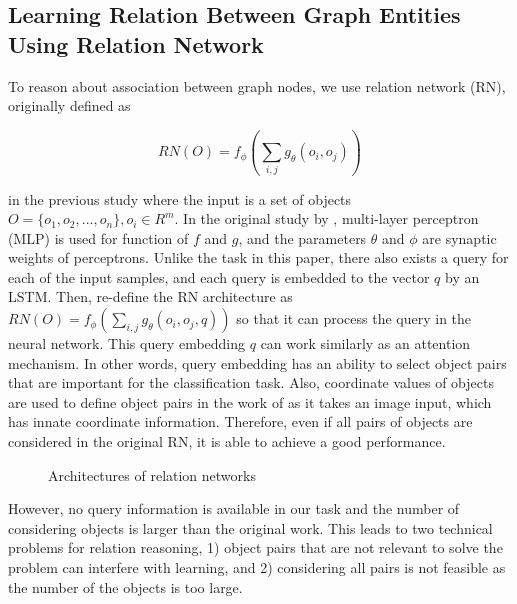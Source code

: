 \documentclass{article}
\begin{document}
\subsection{Learning Relation Between Graph Entities Using Relation Network}
To reason about association between graph nodes, we use relation network (RN), originally defined as

\begin{equation}
\label{eq_vanilla_RN}
RN(O) = f_{\phi}(\sum_{i,j}g_{\theta}(o_i,o_j))
\end{equation}

\noindent in the previous study \cite{santoro2017simple} where the input is a set of objects $O = \{o_1, o_2,..., o_n\}, o_i \in R^m$.
In the original study by \citeauthor{santoro2017simple}, multi-layer perceptron (MLP) is used for function of $f$ and $g$, and the parameters $\theta$ and $\phi$ are synaptic weights of perceptrons.
Unlike the task in this paper, there also exists a query for each of the input samples, and each query is embedded to the vector $q$ by an LSTM. Then, \citeauthor{santoro2017simple} re-define the RN architecture as $RN(O) = f_{\phi}(\sum_{i,j}g_{\theta}(o_i,o_j,q))$ so that it can process the query in the neural network.
This query embedding $q$ can work similarly as an attention mechanism. In other words, query embedding has an ability to select object pairs that are important for the classification task. Also, coordinate values of objects are used to define object pairs in the work of \citeauthor{santoro2017simple} as it takes an image input, which has innate coordinate information. Therefore, even if all pairs of objects are considered in the original RN, it is able to achieve a good performance.

\begin{figure}
\centering     %
{}
\caption{Architectures of relation networks}
\label{fig_RN_diff}
\end{figure}

However, no query information is available in our task and the number of considering objects is larger than the original work. This leads to two technical problems for relation reasoning, 1) object pairs that are not relevant to solve the problem can interfere with learning, and 2) considering all pairs is not feasible as the number of the objects is too large.
\end{document}
